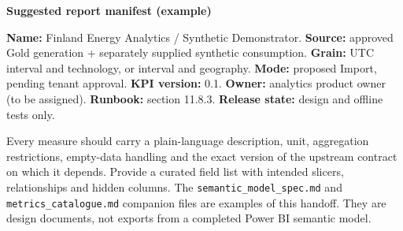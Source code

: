 \documentclass[11pt,twoside]{article}
\begin{document}
\begin{whitebox}\textbf{Suggested report manifest (example)}\par
\textbf{Name:} Finland Energy Analytics / Synthetic Demonstrator. \textbf{Source:} approved Gold generation + separately supplied synthetic consumption. \textbf{Grain:} UTC interval and technology, or interval and geography. \textbf{Mode:} proposed Import, pending tenant approval. \textbf{KPI version:} 0.1. \textbf{Owner:} analytics product owner (to be assigned). \textbf{Runbook:} section 11.8.3. \textbf{Release state:} design and offline tests only.\end{whitebox}
Every measure should carry a plain-language description, unit, aggregation restrictions, empty-data handling and the exact version of the upstream contract on which it depends. Provide a curated field list with intended slicers, relationships and hidden columns. The \texttt{semantic\_model\_spec.md} and \texttt{metrics\_catalogue.md} companion files are examples of this handoff. They are design documents, not exports from a completed Power BI semantic model.
\end{document}
